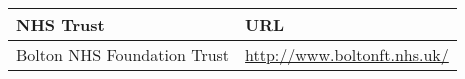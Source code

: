 \begin{center}\label{tab:http_corrections}
    \begin{tabularx}{\textwidth}{p{10em} X}
        NHS Trust & URL \\
        \midrule
        Bolton NHS Foundation Trust 
        & \url{http://www.boltonft.nhs.uk/} \\
        \bottomrule
    \end{tabularx}
\end{center}